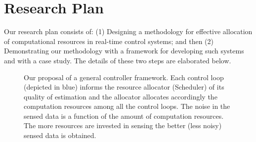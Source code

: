 \documentclass[11pt]{article}
\begin{document}
\section{Research Plan}
\label{sec:Research Plan}

Our research plan consists of: (1) Designing a methodology for effective allocation of computational resources in real-time control systems; and then (2) Demonstrating our methodology with a framework for developing such systems and with a case study. The details of these two steps are elaborated below.


\begin{figure}[]
    \centering
    
    
    \caption{Our proposal of a general controller framework. Each control loop (depicted in blue) informs the resource allocator (Scheduler) of its quality of estimation and the allocator allocates accordingly the computation resources among all the control loops. The noise in the sensed data is a function of the amount of computation resources. The more resources are invested in sensing the better (less noisy) sensed data is obtained.
    \label{fig:general_hybrid_loop}}
\end{figure}
\end{document}
